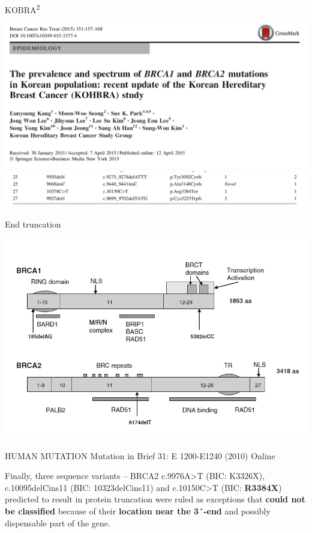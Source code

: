 \documentclass[
  ignorenonframetext,
]{beamer}
\begin{document}
\begin{frame}{KOBRA\textsuperscript{2}}
\protect\hypertarget{kobra--kang_2015_prevalence_breastcancerrestreat}{}

\includegraphics{KOBRA_head.png} \includegraphics{KOBRA.png}

\end{frame}

\begin{frame}{End truncation}
\protect\hypertarget{end-truncation}{}

\includegraphics{BRCA2.png}

\end{frame}

\begin{frame}{HUMAN MUTATION Mutation in Brief 31: E 1200-E1240 (2010)
Online}
\protect\hypertarget{human-mutation-mutation-in-brief-31-e-1200-e1240-2010-online}{}

Finally, three sequence variants -- BRCA2 c.9976A\textgreater{}T (BIC:
K3326X), c.10095delCins11 (BIC: 10323delCins11) and
c.10150C\textgreater{}T (BIC: \textbf{R3384X}) predicted to result in
protein truncation were ruled as exceptions that \textbf{could not be
classified} because of their \textbf{location near the 3´-end} and
possibly dispensable part of the gene.

\end{frame}
\end{document}
